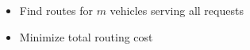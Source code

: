 \documentclass[aspectratio=1610]{beamer}
\newcommand{\important}[1]{{\color{green!60!black}#1}}
\let\oldfootnotesize\footnotesize
\renewcommand*{\footnotesize}{\oldfootnotesize\fontsize{6}{4}\selectfont}
\renewcommand{\footnotesize}{\scriptsize}
\begin{document}
\begin{frame}
\medskip
{}
\begin{itemize}
	\item Find \important{routes} for $m$ vehicles serving all requests
	\item Minimize \important{total routing cost}
\end{itemize}
	
\end{frame}




	
	
\end{document}

